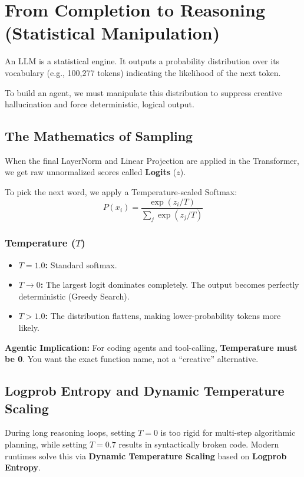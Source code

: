 \chapter{From Completion to Reasoning (Statistical Manipulation)}

An LLM is a statistical engine. It outputs a probability distribution over its vocabulary (e.g., 100,277 tokens) indicating the likelihood of the next token. 

To build an agent, we must manipulate this distribution to suppress creative hallucination and force deterministic, logical output. 

\section{The Mathematics of Sampling}

When the final LayerNorm and Linear Projection are applied in the Transformer, we get raw unnormalized scores called \textbf{Logits} ($z$).

To pick the next word, we apply a Temperature-scaled Softmax:
\begin{equation}
P(x_i) = \frac{\exp(z_i / T)}{\sum_j \exp(z_j / T)}
\end{equation}

\subsection{Temperature ($T$)}
\begin{itemize}
    \item \textbf{$T = 1.0$:} Standard softmax.
    \item \textbf{$T \to 0$:} The largest logit dominates completely. The output becomes perfectly deterministic (Greedy Search).
    \item \textbf{$T > 1.0$:} The distribution flattens, making lower-probability tokens more likely.
\end{itemize}

\textbf{Agentic Implication:} For coding agents and tool-calling, \textbf{Temperature must be 0}. You want the exact function name, not a ``creative'' alternative.

\section{Logprob Entropy and Dynamic Temperature Scaling}

During long reasoning loops, setting $T = 0$ is too rigid for multi-step algorithmic planning, while setting $T = 0.7$ results in syntactically broken code. Modern runtimes solve this via \textbf{Dynamic Temperature Scaling} based on \textbf{Logprob Entropy}.

